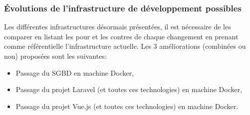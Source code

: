\documentclass[
    iai, %
    il, %
]{heig-tb}
\begin{document}
\subsubsection{Évolutions de l'infrastructure de développement possibles}
Les différentes infrastructures désormais présentées, il est nécessaire de les comparer en listant les pour et les contres de chaque changement en prenant comme référentielle l'infrastructure actuelle.\newline
Les 3 améliorations (combinées ou non) proposées sont les suivantes:
\begin{itemize}
    \item Passage du SGBD en machine Docker,
    \item Passage du projet Laravel (et toutes ces technologies) en machine Docker,
    \item Passage du projet Vue.js (et toutes ces technologies) en machine Docker.
\end{itemize}
\end{document}
